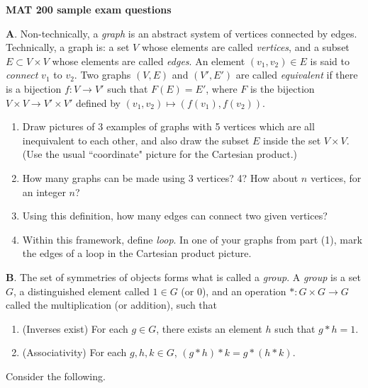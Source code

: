 \documentclass[12pt]{article}
\date{}
\begin{document}
\setlength\parindent{0pt}
\textbf{MAT 200 sample exam questions}
\vspace{1pc}

\textbf{A}.  Non-technically, a \emph{graph} is an abstract system of vertices connected by edges.  Technically, a graph is: a set $V$  whose elements are called \emph{vertices}, and a subset $E\subset V\times V$ whose elements are called \emph{edges}.  An element $(v_1,v_2)\in E$ is said to \emph{connect} $v_1$ to $v_2$.  Two graphs $(V,E)$ and $(V',E')$ are called \emph{equivalent} if there is a bijection $f:V\rightarrow V'$ such that $F(E)=E'$, where $F$ is the bijection $V\times V\rightarrow V'\times V'$ defined by $(v_1,v_2)\mapsto(f(v_1),f(v_2))$.

\begin{enumerate}
\item{Draw pictures of 3 examples of graphs with 5 vertices which are all inequivalent to each other, and also draw the subset $E$ inside the set $V\times V$. (Use the usual ``coordinate" picture for the Cartesian product.)}
\item{How many graphs can be made using 3 vertices?  4?  How about $n$ vertices, for an integer $n$?}
\item{Using this definition, how many edges can connect two given vertices?}
\item{Within this framework, define \emph{loop}.  In one of your graphs from part (1), mark the edges of a loop in the Cartesian product picture.}
\end{enumerate}

\textbf{B}.  The set of symmetries of objects forms what is called a \emph{group}.  A \emph{group} is a set $G$, a distinguished element called $1\in G$ (or 0), and an operation $*:G\times G\rightarrow G$ called the multiplication (or addition), such that

\begin{enumerate}
\item{(Inverses exist) For each $g\in G$, there exists an element $h$ such that $g*h=1$.}
\item{(Associativity) For each $g,h,k\in G$, $(g*h)*k=g*(h*k)$.}
\end{enumerate}

Consider the following.
\end{document}
